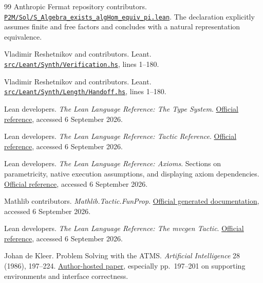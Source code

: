 \documentclass[11pt,a4paper]{article}
\theoremstyle{definition}
\theoremstyle{remark}
\newcommand{\code}[1]{\texttt{\detokenize{#1}}}
\begin{document}
\begin{thebibliography}{99}
 Anthropic Fermat repository contributors.
\href{https://github.com/anthropics/fermats-last-theorem/blob/aa2d8b34692b16c70f699536de0d8e75b9a3e9ef/P2M/Sol/S_Algebra_exists_algHom_equiv_pi.lean}{\nolinkurl{P2M/Sol/S_Algebra_exists_algHom_equiv_pi.lean}}.
The \code{solution} declaration explicitly assumes finite and free factors
and concludes with a natural representation equivalence.

 Vladimir Reshetnikov and contributors. Leant.
\href{https://github.com/VladimirReshetnikov/Leant/blob/3a40904be8a410d832d9ab6900b3d3e7b425eccb/src/Leant/Synth/Verification.hs#L1-L180}{\nolinkurl{src/Leant/Synth/Verification.hs}}, lines 1--180.

 Vladimir Reshetnikov and contributors. Leant.
\href{https://github.com/VladimirReshetnikov/Leant/blob/3a40904be8a410d832d9ab6900b3d3e7b425eccb/src/Leant/Synth/Length/Handoff.hs#L1-L180}{\nolinkurl{src/Leant/Synth/Length/Handoff.hs}}, lines 1--180.

 Lean developers. \emph{The Lean Language Reference: The Type System}.
\href{https://lean-lang.org/doc/reference/latest/The-Type-System/}{Official reference}, accessed 6 September 2026.

 Lean developers. \emph{The Lean Language Reference: Tactic Reference}.
\href{https://lean-lang.org/doc/reference/latest/Tactic-Proofs/Tactic-Reference/}{Official reference}, accessed 6 September 2026.

 Lean developers. \emph{The Lean Language Reference: Axioms}.
Sections on parametricity, native execution assumptions, and displaying axiom dependencies.
\href{https://lean-lang.org/doc/reference/latest/Axioms/}{Official reference}, accessed 6 September 2026.

 Mathlib contributors. \emph{Mathlib.Tactic.FunProp}.
\href{https://leanprover-community.github.io/mathlib4_docs/Mathlib/Tactic/FunProp.html}{Official generated documentation}, accessed 6 September 2026.

 Lean developers. \emph{The Lean Language Reference: The mvcgen Tactic}.
\href{https://lean-lang.org/doc/reference/latest/The--mvcgen--tactic/}{Official reference}, accessed 6 September 2026.

 Johan de Kleer. Problem Solving with the ATMS.
\emph{Artificial Intelligence} 28 (1986), 197--224.
\href{https://dekleer.org/Publications/Problem\%20Solving\%20with\%20the\%20ATMS.pdf}{Author-hosted paper}, especially pp.\ 197--201 on supporting environments and interface correctness.


\end{thebibliography}
\end{document}
